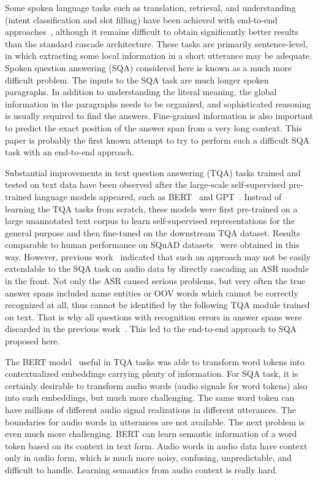 \documentclass[a4paper]{article}
\begin{document}
Some spoken language tasks such as translation, retrieval, and understanding (intent classification and slot filling) have been achieved with end-to-end approaches~\cite{haghani2018audio, chen2018spoken, palogiannidi2020end, price2020end, huang2020leveraging}, although it remains difficult to obtain significantly better results than the standard cascade architecture. These tasks are primarily sentence-level, in which extracting some local information in a short utterance may be adequate. Spoken question answering (SQA) considered here is known as a much more difficult problem. The inputs to the SQA task are much longer spoken paragraphs. In addition to understanding the literal meaning, the global information in the paragraphs needs to be organized, and sophisticated reasoning is usually required to find the answers. Fine-grained information is also important to predict the exact position of the answer span from a very long context. This paper is probably the first known attempt to try to perform such a difficult SQA task with an end-to-end approach.

Substantial improvements in text question answering (TQA) tasks trained and tested on text data have been observed after the large-scale self-supervised pre-trained language models appeared, such as BERT~\cite{devlin2019bert} and GPT~\cite{Radford2018ImprovingLU}. Instead of learning the TQA tasks from scratch, these models were first pre-trained on a large unannotated text corpus to learn self-supervised representations for the general purpose and then fine-tuned on the downstream TQA dataset. Results comparable to human performance on SQuAD datasets~\cite{squad2016, squad2018} were obtained in this way. However, previous work~\cite{Lee2018spoken} indicated that such an approach may not be easily extendable to the SQA task on audio data by directly cascading an ASR module in the front. Not only the ASR caused serious problems, but very often the true answer spans included name entities or OOV words which cannot be correctly recognized at all, thus cannot be identified by the following TQA module trained on text. That is why all questions with recognition errors in answer spans were discarded in the previous work~\cite{Lee2018spoken}. This led to the end-to-end approach to SQA proposed here.

The BERT model~\cite{devlin2019bert} useful in TQA tasks was able to transform word tokens into contextualized embeddings carrying plenty of information. For SQA task, it is certainly desirable to transform audio words (audio signals for word tokens) also into such embeddings, but much more challenging. The same word token can have millions of different audio signal realizations in different utterances. 
The boundaries for audio words in utterances are not available. 
The next problem is even much more challenging. BERT can learn semantic information of a word token based on its context in text form. Audio words in audio data have context only in audio form, which is much more noisy, confusing, unpredictable, and difficult to handle. Learning semantics from audio context is really hard.
\end{document}
